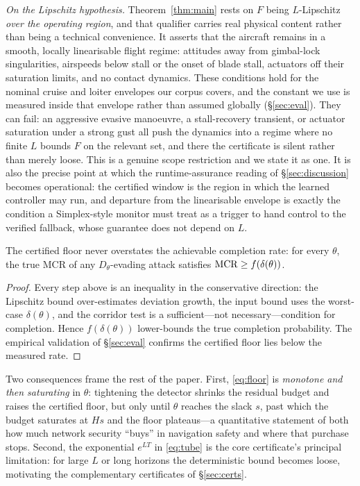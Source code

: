 \emph{On the Lipschitz hypothesis.} Theorem~\ref{thm:main} rests on $F$ being
$L$-Lipschitz \emph{over the operating region}, and that qualifier carries real
physical content rather than being a technical convenience. It asserts that the
aircraft remains in a smooth, locally linearisable flight regime: attitudes away
from gimbal-lock singularities, airspeeds below stall or the onset of blade
stall, actuators off their saturation limits, and no contact dynamics. These
conditions hold for the nominal cruise and loiter envelopes our corpus covers,
and the constant we use is measured inside that envelope rather than assumed
globally (\S\ref{sec:eval}). They can fail: an aggressive evasive manoeuvre, a
stall-recovery transient, or actuator saturation under a strong gust all push
the dynamics into a regime where no finite $L$ bounds $F$ on the relevant set,
and there the certificate is silent rather than merely loose. This is a genuine
scope restriction and we state it as one. It is also the precise point at which
the runtime-assurance reading of \S\ref{sec:discussion} becomes operational: the
certified window is the region in which the learned controller may run, and
departure from the linearisable envelope is exactly the condition a
Simplex-style monitor must treat as a trigger to hand control to the verified
fallback, whose guarantee does not depend on $L$.

\begin{proposition}[Soundness]
\label{prop:sound}
The certified floor never overstates the achievable completion rate: for every
$\theta$, the true MCR of any $D_\theta$-evading attack satisfies
$\mathrm{MCR}\ge f(\delta(\theta))$.
\end{proposition}
\begin{proof}
Every step above is an inequality in the conservative direction: the Lipschitz
bound over-estimates deviation growth, the input bound uses the worst-case
$\delta(\theta)$, and the corridor test is a sufficient---not
necessary---condition for completion. Hence $f(\delta(\theta))$ lower-bounds the
true completion probability. The empirical validation of \S\ref{sec:eval}
confirms the certified floor lies below the measured rate.
\end{proof}

Two consequences frame the rest of the paper. First, \eqref{eq:floor} is
\emph{monotone and then saturating} in $\theta$: tightening the detector shrinks
the residual budget and raises the certified floor, but only until $\theta$
reaches the slack $s$, past which the budget saturates at $Hs$ and the floor
plateaus---a quantitative statement of both how much network security ``buys''
in navigation safety and where that purchase stops. Second, the exponential
$e^{LT}$ in \eqref{eq:tube} is the core certificate's principal limitation: for large
$L$ or long horizons the deterministic bound becomes loose, motivating the
complementary certificates of \S\ref{sec:certs}.

